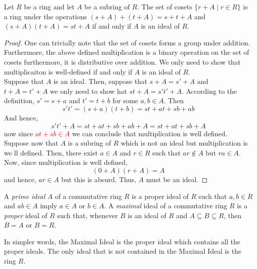 \begin{proposition}
	Let $R$ be a ring and let $A$ be a subring of $R$. The set of cosets $\{r+A\mid r\in R\}$ is a ring under the operations $(s+A)+(t+A) = s+t+A$ and $(s+A)(t+A)= st+A$ if and only if $A$ is an ideal of $R$.
\end{proposition}
\begin{proof}
	One can trivially note that the set of cosets forms a group under addition. Furthermore, the above defined multiplication is a binary operation on the set of cosets furthermore, it is distributive over addition. We only need to show that multiplicaiton is well-defined if and only if $A$ is an ideal of $R$.\\
	Suppose that $A$ is an ideal. Then, suppose that $s+A = s' + A$ and $t+A = t'+ A$ we only need to show hat $st + A = s't' + A$. According to the definition, $s' =  s + a$ and $t' = t + b$ for some $a,b\in A$. Then
	\begin{equation*}
		s't' = (s+a)(t+b) = st + at + sb + ab
	\end{equation*}
	And hence,
	\begin{equation*}
		s't' + A = st + at + sb + ab + A = st + at + sb + A 
	\end{equation*}
	now since \textcolor{red}{$at + sb \in A$} we can conclude that multiplication is well defined.\\
	Suppose now that $A$ is a subring of $R$ which is not an ideal but multiplication is we ll defined. Then, there exist $a\in A$ and $r\in R$ such that $ar\notin A$ but $ra\in A$. Now, since multiplication is well defined,
	$$
	(0+A)(r+A) = A
	$$
	and hence, $ar\in A$ but this is absurd. Thus, $A$ must be an ideal.
\end{proof}

\begin{definition}
	A \textit{prime ideal} $A$ of a commutative ring $R$ is a proper ideal of $R$ such that $a,b\in R$ and $ab\in A$ imply $a\in A$ or $b\in A$. A \textit{maximal} ideal of a commutative ring $R$ is a \textit{proper} ideal of $R$ such that, whenever $B$ is an ideal of $R$ and $A\subseteq B\subseteq R$, then $B=A$ or $B=R$.
\end{definition}
In simpler words, the Maximal Ideal is the proper ideal which contains all the proper ideals. The only ideal that is not contained in the Maximal Ideal is the ring $R$.

